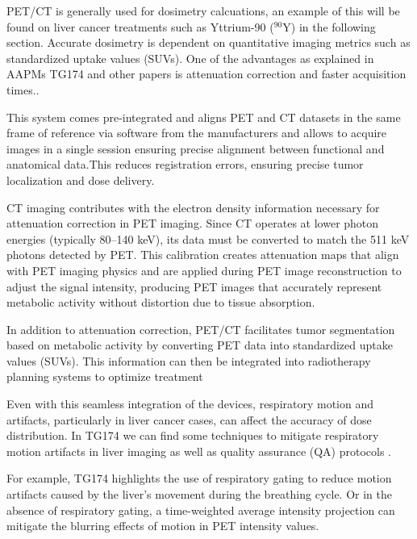 \begin{multicols}{2}
PET/CT is generally used for dosimetry calcuations, an example of this will be found on liver cancer treatments such as Yttrium-90 (\(^{90}\text{Y}\)) in the following section. Accurate dosimetry is dependent on quantitative imaging metrics such as standardized uptake values (SUVs). One of the advantages as explained in AAPMs TG174 and other papers is attenuation correction and faster acquisition times.\cite{knesaurek2018,TG174}. 

This system comes pre-integrated and aligns PET and CT datasets in the same frame of reference via software from the manufacturers and allows to acquire images in a single session ensuring precise alignment between functional and anatomical data.This reduces registration errors, ensuring precise tumor localization and dose delivery. 

CT imaging contributes with the electron density information necessary for attenuation correction in PET imaging. Since CT operates at lower photon energies (typically 80–140 keV), its data must be converted to match the 511 keV photons detected by PET. This calibration creates attenuation maps that align with PET imaging physics and are applied during PET image reconstruction to adjust the signal intensity, producing PET images that accurately represent metabolic activity without distortion due to tissue absorption.\cite{knesaurek2018, TG174}

In addition to attenuation correction, PET/CT facilitates tumor segmentation based on metabolic activity by converting PET data into standardized uptake values (SUVs). This information can then be integrated into radiotherapy planning systems to optimize treatment

Even with this seamless integration of the devices, respiratory motion and artifacts, particularly in liver cancer cases, can affect the accuracy of dose distribution. In TG174 we can find some techniques to mitigate respiratory motion artifacts in liver imaging as well as quality assurance (QA) protocols \cite{TG174}.

For example, TG174 highlights the use of respiratory gating to reduce motion artifacts caused by the liver’s movement during the breathing cycle. Or in the absence of respiratory gating, a time-weighted average intensity projection can mitigate the blurring effects of motion in PET intensity values.


\end{multicols}

